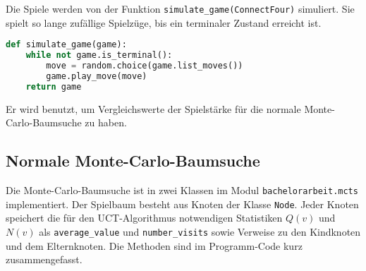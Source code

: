 Die Spiele werden von der Funktion \verb|simulate_game(ConnectFour)| simuliert.
Sie spielt so lange zufällige Spielzüge, bis ein terminaler Zustand erreicht ist.

\begin{lstlisting}[language=Python]
def simulate_game(game):
    while not game.is_terminal():
        move = random.choice(game.list_moves())
        game.play_move(move)
    return game
\end{lstlisting}

Er wird benutzt, um Vergleichswerte der Spielstärke für die normale Monte-Carlo-Baumsuche zu haben.

\subsection{Normale Monte-Carlo-Baumsuche}
\label{subsec:normale-monte-carlo-baumsuche}

Die Monte-Carlo-Baumsuche ist in zwei Klassen im Modul \verb|bachelorarbeit.mcts| implementiert.
Der Spielbaum besteht aus Knoten der Klasse \verb|Node|.
Jeder Knoten speichert die für den UCT-Algorithmus notwendigen Statistiken $Q(v)$ und $N(v)$ als \verb|average_value| und \verb|number_visits| sowie Verweise zu den Kindknoten und dem Elternknoten.
Die Methoden sind im Programm-Code kurz zusammengefasst.

